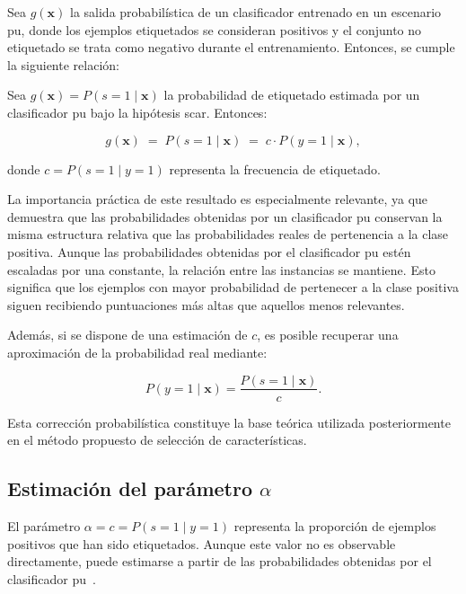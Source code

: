 Sea $g(\mathbf{x})$ la salida probabilística de un clasificador entrenado en un escenario \acrshort{pu}, donde los ejemplos etiquetados se consideran positivos y el conjunto no etiquetado se trata como negativo durante el entrenamiento. Entonces, se cumple la siguiente relación:

\begin{theorem}
Sea $g(\mathbf{x}) = P(s=1 \mid \mathbf{x})$ la probabilidad de etiquetado estimada por un clasificador \acrshort{pu} bajo la hipótesis \acrshort{scar}. Entonces:

\begin{equation}
  g(\mathbf{x}) \;=\; P(s=1 \mid \mathbf{x}) \;=\; c \cdot P(y=1 \mid \mathbf{x}),
  \label{eq:elkan_noto}
\end{equation}

donde $c = P(s=1 \mid y=1)$ representa la frecuencia de etiquetado.
\end{theorem}

La importancia práctica de este resultado es especialmente relevante, ya que demuestra que las probabilidades obtenidas por un clasificador \acrshort{pu} conservan la misma estructura relativa que las probabilidades reales de pertenencia a la clase positiva. Aunque las probabilidades obtenidas por el clasificador \acrshort{pu} estén escaladas por una constante, la relación entre las instancias se mantiene. Esto significa que los ejemplos con mayor probabilidad de pertenecer a la clase positiva siguen recibiendo puntuaciones más altas que aquellos menos relevantes.

Además, si se dispone de una estimación de $c$, es posible recuperar una aproximación de la probabilidad real mediante:

\[
P(y=1 \mid \mathbf{x})
=
\frac{P(s=1 \mid \mathbf{x})}{c}.
\]

Esta corrección probabilística constituye la base teórica utilizada posteriormente en el método propuesto de selección de características.

\subsection{Estimación del parámetro $\alpha$}
\label{subsec:estimacion_alpha}

El parámetro $\alpha = c = P(s=1 \mid y=1)$ representa la proporción de ejemplos positivos que han sido etiquetados. Aunque este valor no es observable directamente, puede estimarse a partir de las probabilidades obtenidas por el clasificador \acrshort{pu}~\cite{elkan2008learning}.

